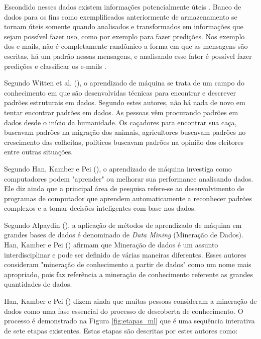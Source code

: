 Escondido nesses dados existem informações potencialmente úteis \cite{Witten:2016:DMF:3086818}. Banco de dados para os fins como exemplificados anteriormente de armazenamento se tornam úteis somente quando analisados e transformados em informações que sejam possível fazer uso, como por exemplo para fazer predições. Nos exemplo dos e-mails, não é completamente randômico a forma em que as mensagens são escritas, há um padrão nessas mensagens, e analisando esse fator é possível fazer predições e classificar os e-mails \cite{Alpaydin:2010:IML:1734076}.

Segundo Witten et al. (\citeyear{Witten:2016:DMF:3086818}), o aprendizado de máquina se trata de um campo do conhecimento em que são desenvolvidas técnicas para encontrar e descrever padrões estruturais em dados. Segundo estes autores, não há nada de novo em tentar encontrar padrões em dados. As pessoas vêm procurando padrões em dados desde o início da humanidade. Os caçadores para encontrar sua caça, buscavam padrões na migração dos animais, agricultores buscavam padrões no crescimento das colheitas, políticos buscavam padrões na opinião dos eleitores entre outras situações.

Segundo Han, Kamber e Pei (\citeyear{Han:2011:DMC:1972541}), o aprendizado de máquina investiga como computadores podem "aprender" ou melhorar sua performance analisando dados. Ele diz ainda que a principal área de pesquisa refere-se ao desenvolvimento de programas de computador que aprendem automaticamente a reconhecer padrões complexos e a tomar decisões inteligentes com base nos dados.

Segundo Alpaydin (\citeyear{Alpaydin:2010:IML:1734076}), a aplicação de métodos de aprendizado de máquina em grandes bases de dados é denominado de \textit{Data Mining} (Mineração de Dados). Han, Kamber e Pei (\citeyear{Han:2011:DMC:1972541}) afirmam que Mineração de dados é um assunto interdisciplinar e pode ser definido de várias maneiras diferentes. Esses autores consideram "mineração de conhecimento a partir de dados" como um nome mais apropriado, pois faz referência a mineração de conhecimento referente as grandes quantidades de dados.

Han, Kamber e Pei (\citeyear{Han:2011:DMC:1972541}) dizem ainda que muitas pessoas consideram a mineração de dados como uma fase essencial do processo de descoberta de conhecimento. O processo é demonstrado na Figura \ref{fig:etapas_ml} que é uma sequência interativa de sete etapas existentes. Estas etapas são descritas por estes autores como:


